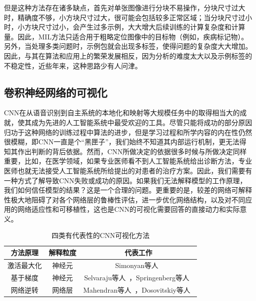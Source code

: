 但是这种方法存在诸多缺点，首先对单张图像进行分块不易操作，分块尺寸过大时，精确度不够，小方块尺寸过大，很可能会包括较多正常区域；当分块尺寸过小时，小方块尺寸过小，会产生过多示例，大大增大后续训练的计算复杂度和计算量。因此，MIL方法只适合用于粗略定位图像中的目标物（例如，疾病标记物）。另外，当处理多类问题时，示例包就会出现多标签，使得问题的复杂度大大增加。因此，与其在算法和应用上的繁荣发展相反，因为分析的难度太大以及示例标签的不稳定性，近些年来，这种思路少有人问津。

\subsection{卷积神经网络的可视化}\label{subsec:visulization_methods}
CNN在从语音识别到自主系统的本地化和映射等大规模任务中的取得相当大的成就，使其成为先进的人工智能系统中最受欢迎的工具。尽管只能将成功的部分原因归功于这种网络的训练过程中算法的进步，但是学习过程和所学内容的内在性仍然很模糊，即CNN一直是个“黑匣子”，我们始终不知道其内部运行机制，更无法得知其作出判断的背后依据。然而，CNN所做决定的依据很多时候与所做决定同样重要，比如，在医学领域，如果专业医师看不到人工智能系统给出诊断方法，专业医师也就无法接受人工智能系统所给提出的对患者的治疗方案。因此，我们需要有一种方式了解导致CNN失败或成功的原因。如果我们无法解释模型的工作原理，我们如何信任模型的结果？这是一个合理的问题。更重要的是，较差的网络可解释性极大地阻碍了对各个网络层的鲁棒性评估，进一步优化网络结构，以及对不同应用的网络适应性和可移植性，这也是CNN的可视化需要回答的直接动力和实际意义。
\begin{table}[h]
	\centering
	\caption{四类有代表性的CNN可视化方法}		
	\label{tab:typical_visualization_methods}
	\begin{tabular}{c|c|c}
		\toprule[2pt]
		方法原理 & 解释粒度 & 代表工作 \\ \midrule[2pt]
		激活最大化 & 神经元  & Simonyan等人~\cite{simonyan2013deep}  \\\hline
		基于梯度 &  神经元 & Selvaraju等人~\cite{selvaraju2017grad}，Springenberg等人~\cite{springenberg2014striving} \\  \hline
		网络逆转 & 网络层 &Mahendran等人~\cite{mahendran2015understanding, mahendran2016visualizing}，Dosovitskiy等人~\cite{dosovitskiy2016inverting}\\
		\bottomrule[2pt]
	\end{tabular}
	\label{tab:four_visulization_types}
\end{table}

